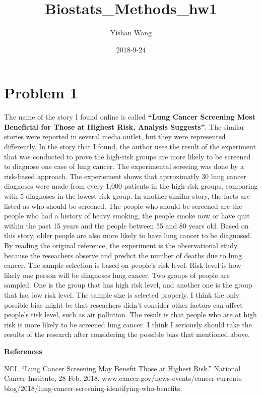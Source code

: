 \documentclass[]{article}
\title{Biostats\_Methods\_hw1}
\author{Yishan Wang}
\date{2018-9-24}
\begin{document}
\maketitle

\section{Problem 1}\label{problem-1}

The name of the story I found online is called \textbf{``Lung Cancer
Screening Most Beneficial for Those at Highest Risk, Analysis
Suggests''}. The similar stories were reported in several media outlet,
but they were represented differently. In the story that I found, the
author uses the result of the experiment that was conducted to prove the
high-risk groups are more likely to be screened to diagnose one case of
lung cancer. The experimental screeing was done by a risk-based
approach. The experiement shows that aprroximatly 30 lung cancer
diagnoses were made from every 1,000 patients in the high-risk groups,
comparing with 5 diagnoses in the lowest-risk group. In another similar
story, the facts are listed as who should be screened. The people who
should be screened are the people who had a history of heavy smoking,
the people smoke now or have quit within the past 15 years and the
people between 55 and 80 years old. Based on this story, older people
are also more likely to have lung cancer to be diagnosed. By reading the
original reference, the experiment is the observational study because
the reseachers observe and predict the number of deaths due to lung
cancer. The sample selection is based on people's risk level. Risk level
is how likely one person will be diagnoses lung cancer. Two groups of
people are sampled. One is the group that has high risk level, and
another one is the group that has low risk level. The sample size is
selected properly. I think the only possible bias might be that
reseachers didn't consider other factors can affect people's risk level,
such as air pollution. The result is that people who are at high risk is
more likely to be screened lung cancer. I think I seriously should take
the results of the research after considering the possible bias that
mentioned above.

\textbf{References}

NCI. ``Lung Cancer Screening May Benefit Those at Highest Risk.''
National Cancer Institute, 28 Feb. 2018,
www.cancer.gov/news-events/cancer-currents-blog/2018/lung-cancer-screening-identifying-who-benefits.
\end{document}
